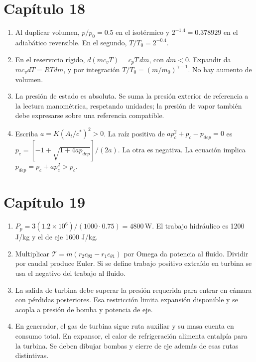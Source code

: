 \section*{Capítulo 18}
\begin{enumerate}
\item Al duplicar volumen, $p/p_0=0.5$ en el isotérmico y $2^{-1.4}=0.378929$ en el adiabático reversible. En el segundo, $T/T_0=2^{-0.4}$.
\item En el reservorio rígido, $d(mc_vT)=c_pT\,dm$, con $dm<0$. Expandir da $m c_vdT=RTdm$, y por integración $T/T_0=(m/m_0)^{\gamma-1}$. No hay aumento de volumen.
\item La presión de estado es absoluta. Se suma la presión exterior de referencia a la lectura manométrica, respetando unidades; la presión de vapor también debe expresarse sobre una referencia compatible.
\item Escriba $a=K(A_t/c^*)^2>0$. La raíz positiva de $ap_c^2+p_c-p_{dep}=0$ es $p_c=[-1+\sqrt{1+4ap_{dep}}]/(2a)$. La otra es negativa. La ecuación implica $p_{dep}=p_c+ap_c^2>p_c$.
\end{enumerate}
\section*{Capítulo 19}
\begin{enumerate}
\item $P_p=3(1.2\times10^6)/(1000\cdot0.75)=4800\,\mathrm W$. El trabajo hidráulico es 1200 J/kg y el de eje 1600 J/kg.
\item Multiplicar $\mathcal T=\dot m(r_2c_{\theta2}-r_1c_{\theta1})$ por Omega da potencia al fluido. Dividir por caudal produce Euler. Si se define trabajo positivo extraído en turbina se usa el negativo del trabajo al fluido.
\item La salida de turbina debe superar la presión requerida para entrar en cámara con pérdidas posteriores. Esa restricción limita expansión disponible y se acopla a presión de bomba y potencia de eje.
\item En generador, el gas de turbina sigue ruta auxiliar y su masa cuenta en consumo total. En expansor, el calor de refrigeración alimenta entalpía para la turbina. Se deben dibujar bombas y cierre de eje además de esas rutas distintivas.
\end{enumerate}
